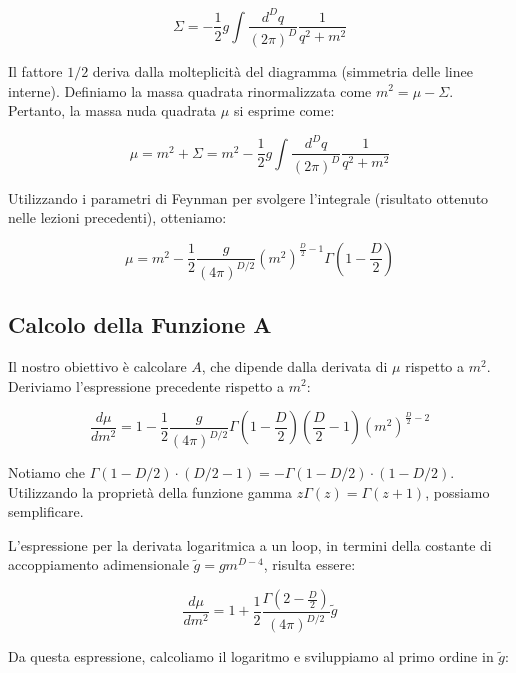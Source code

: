 \begin{equation}
\Sigma = -\frac{1}{2} g \int \frac{d^D q}{(2\pi)^D} \frac{1}{q^2 + m^2}
\end{equation}

Il fattore $1/2$ deriva dalla molteplicità del diagramma (simmetria delle linee interne).
Definiamo la massa quadrata rinormalizzata come $m^2 = \mu - \Sigma$. Pertanto, la massa nuda quadrata $\mu$ si esprime come:

\begin{equation}
\mu = m^2 + \Sigma = m^2 - \frac{1}{2} g \int \frac{d^D q}{(2\pi)^D} \frac{1}{q^2 + m^2}
\end{equation}

Utilizzando i parametri di Feynman per svolgere l'integrale (risultato ottenuto nelle lezioni precedenti), otteniamo:

\begin{equation}
\mu = m^2 - \frac{1}{2} \frac{g}{(4\pi)^{D/2}} (m^2)^{\frac{D}{2}-1} \Gamma\left(1 - \frac{D}{2}\right)
\end{equation}

\subsection{Calcolo della Funzione A}

Il nostro obiettivo è calcolare $A$, che dipende dalla derivata di $\mu$ rispetto a $m^2$. Deriviamo l'espressione precedente rispetto a $m^2$:

\begin{equation}
\frac{d\mu}{dm^2} = 1 - \frac{1}{2} \frac{g}{(4\pi)^{D/2}} \Gamma\left(1 - \frac{D}{2}\right) \left(\frac{D}{2}-1\right) (m^2)^{\frac{D}{2}-2}
\end{equation}

\noindent Notiamo che $\Gamma(1 - D/2) \cdot (D/2 - 1) = -\Gamma(1 - D/2) \cdot (1 - D/2)$. Utilizzando la proprietà della funzione gamma $z\Gamma(z) = \Gamma(z+1)$, possiamo semplificare. 

\noindent L'espressione per la derivata logaritmica a un loop, in termini della costante di accoppiamento adimensionale $\tilde{g} = g m^{D-4}$, risulta essere:

\begin{equation}
\frac{d\mu}{dm^2} = 1 + \frac{1}{2} \frac{\Gamma(2 - \frac{D}{2})}{(4\pi)^{D/2}} \tilde{g}
\end{equation}

\noindent Da questa espressione, calcoliamo il logaritmo e sviluppiamo al primo ordine in $\tilde{g}$:

